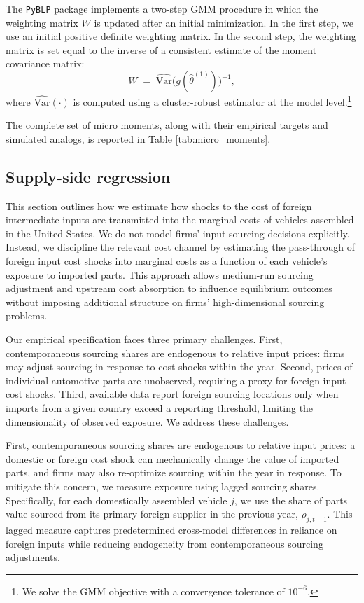 \documentclass[11pt]{article}
\begin{document}
The \texttt{PyBLP} package implements a two-step GMM procedure in which the weighting matrix \(W\) is updated after an initial minimization. In the first step, we use an initial positive definite weighting matrix. In the second step, the weighting matrix is set equal to the inverse of a consistent estimate of the moment covariance matrix:
\begin{equation}
W
\;=\;
\widehat{\mathrm{Var}}\!\bigl(g(\hat{\theta}^{(1)})\bigr)^{-1},
\end{equation}
where \(\widehat{\mathrm{Var}}(\cdot)\) is computed using a cluster-robust estimator at the model level.\footnote{We solve the GMM objective with a convergence tolerance of \(10^{-6}\).}

The complete set of micro moments, along with their empirical targets and simulated analogs, is reported in Table \ref{tab:micro_moments}.

\subsection{Supply-side regression}
\label{subsec:supply_regression}

This section outlines how we estimate how shocks to the cost of foreign intermediate inputs are transmitted into the marginal costs of vehicles assembled in the United States. We do not model firms’ input sourcing decisions explicitly. Instead, we discipline the relevant cost channel by estimating the pass-through of foreign input cost shocks into marginal costs as a function of each vehicle’s exposure to imported parts. This approach allows medium-run sourcing adjustment and upstream cost absorption to influence equilibrium outcomes without imposing additional structure on firms’ high-dimensional sourcing problems.

Our empirical specification faces three primary challenges. First, contemporaneous sourcing shares are endogenous to relative input prices: firms may adjust sourcing in response to cost shocks within the year. Second, prices of individual automotive parts are unobserved, requiring a proxy for foreign input cost shocks. Third, available data report foreign sourcing locations only when imports from a given country exceed a reporting threshold, limiting the dimensionality of observed exposure. We address these challenges.

First, contemporaneous sourcing shares are endogenous to relative input prices: a domestic or foreign cost shock can mechanically change the value of imported parts, and firms may also re-optimize sourcing within the year in response. To mitigate this concern, we measure exposure using lagged sourcing shares. Specifically, for each domestically assembled vehicle $j$, we use the share of parts value sourced from its primary foreign supplier in the previous year, $\rho_{j,t-1}$. This lagged measure captures predetermined cross-model differences in reliance on foreign inputs while reducing endogeneity from contemporaneous sourcing adjustments.
\end{document}
